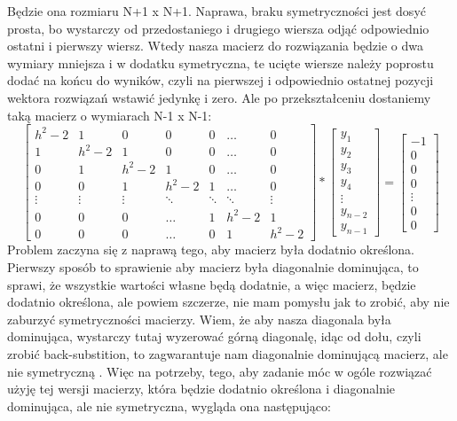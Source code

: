 \documentclass[12pt]{article}
\begin{document}
Będzie ona rozmiaru N+1 x N+1. Naprawa, braku symetryczności jest dosyć prosta, bo wystarczy od przedostaniego i drugiego wiersza odjąć odpowiednio ostatni i pierwszy wiersz. Wtedy nasza macierz do rozwiązania będzie o dwa wymiary mniejsza i w dodatku symetryczna, te ucięte wiersze należy poprostu dodać na końcu do wyników, czyli na pierwszej i odpowiednio ostatnej pozycji wektora rozwiązań wstawić jedynkę i zero. Ale po przekształceniu dostaniemy taką macierz o wymiarach N-1 x N-1:
\[
\begin{bmatrix}
    h^{2}-2 & 1 & 0 & 0 & 0 & \dots & 0\\
    1 & h^{2}-2 & 1 & 0 & 0 & \dots & 0\\ 
    0 & 1 & h^{2}-2 & 1 & 0 & \dots & 0\\
    0 & 0 & 1 & h^{2}-2 & 1 &\dots & 0\\
    \vdots & \vdots & \vdots & \ddots & \ddots & \ddots & \vdots\\
    0 & 0 & 0 & \hdots & 1 & h^{2}-2 & 1\\
    0 & 0 & 0 & \hdots & 0 & 1 & h^{2}-2
\end{bmatrix}
*
\begin{bmatrix}
    y_{1}\\
    y_{2}\\
    y_{3}\\
    y_{4}\\
    \vdots\\
    y_{n-2}\\
    y_{n-1}
\end{bmatrix}
=
\begin{bmatrix}
    -1\\
    0\\
    0\\
    0\\
    \vdots\\
    0\\
    0
\end{bmatrix}
\]
Problem zaczyna się z naprawą tego, aby macierz była dodatnio określona. Pierwszy sposób to sprawienie aby macierz była diagonalnie dominująca, to sprawi, że wszystkie wartości własne będą dodatnie, a więc macierz, będzie dodatnio określona, ale powiem szczerze, nie mam pomysłu jak to zrobić, aby nie zaburzyć symetryczności macierzy. Wiem, że aby nasza diagonala była dominująca, wystarczy tutaj wyzerować górną diagonalę, idąc od dołu, czyli zrobić back-substition, to zagwarantuje nam diagonalnie dominującą macierz, ale nie symetryczną . Więc na potrzeby, tego, aby zadanie móc w ogóle rozwiązać użyję tej wersji macierzy, która będzie dodatnio określona i diagonalnie dominująca, ale nie symetryczna, wygląda ona następująco:
\end{document}
